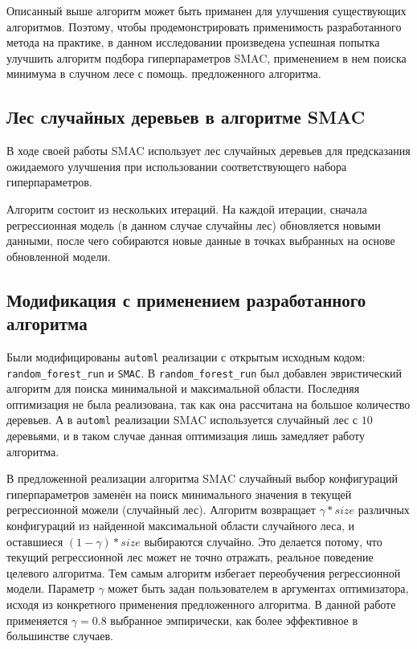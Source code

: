 Описанный выше алгоритм может быть приманен для улучшения существующих
алгоритмов. Поэтому, чтобы продемонстрировать применимость разработанного метода
на практике, в данном исследовании произведена успешная попытка улучшить
алгоритм подбора гиперпараметров SMAC, применением в нем поиска минимума
в случном лесе с помощь. предложенного алгоритма.

\subsection{Лес случайных деревьев в алгоритме SMAC}

В ходе своей работы SMAC использует лес случайных деревьев для предсказания
ожидаемого улучшения при использовании соответствующего набора гиперпараметров.

Алгоритм состоит из нескольких итераций. На каждой итерации, сначала
регрессионная модель (в данном случае случайны лес) обновляется новыми данными,
после чего собираются новые данные в точках выбранных на основе обновленной
модели.

\subsection{Модификация с применением разработанного алгоритма}

Были модифицированы \texttt{automl} реализации с открытым исходным кодом:
\texttt{random\_forest\_run} и \texttt{SMAC}. В \texttt{random\_forest\_run} был
добавлен эвристический алгоритм для поиска минимальной и максимальной области.
Последняя оптимизация не была реализована, так как она рассчитана на большое
количество деревьев. А в \texttt{automl} реализации SMAC используется случайный
лес с $10$ деревьями, и в таком случае данная оптимизация лишь замедляет работу
алгоритма.

В предложенной реализации алгоритма SMAC случайный выбор конфигураций
гиперпараметров заменён на поиск минимального значения в текущей регрессионной
можели (случайный лес). Алгоритм возвращает $\gamma * size$ различных
конфигураций из найденной максимальной области случайного леса, и оставшиеся $(1
- \gamma) * size$ выбираются случайно. Это делается потому, что текущий
регрессионной лес может не точно отражать, реальное поведение целевого
алгоритма. Тем самым алгоритм избегает переобучения регрессионной модели.
Параметр $\gamma$ может быть задан пользователем в аргументах оптимизатора,
исходя из конкретного применения предложенного алгоритма. В данной работе
применяется $\gamma=0.8$ выбранное эмпирически, как более эффективное
в большинстве случаев.


